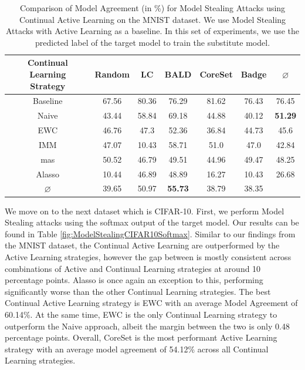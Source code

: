 \begin{table}[h]
    \centering
    \begin{tabular}{c | c c c c c | c} 
        \hline
        \diagbox[width=11em]{Active \\ Learning Strategy}{Continual Learning \\ Strategy} & Random & LC & BALD & CoreSet & Badge & $\varnothing$ \\ 
        \hline 
        Baseline & 67.56 & 80.36 & 76.29 & 81.62 & 76.43 & 76.45\\
        \hline
        Naive & 43.44 & 58.84 & 69.18 & 44.88 & 40.12 & \textbf{51.29}\\
        EWC &  46.76 & 47.3 & 52.36 & 36.84 & 44.73 & 45.6\\
        IMM & 47.07 & 10.43 & 58.71 & 51.0 & 47.0 & 42.84\\
        \gls{mas} & 50.52 & 46.79 & 49.51 & 44.96 & 49.47 & 48.25\\
        Alasso &  10.44 & 46.89 & 48.89 & 16.27 & 10.43 & 26.68\\
        \hline
        $\varnothing$ & 39.65 & 50.97 & \textbf{55.73} & 38.79 & 38.35\\
        \hline
    \end{tabular}
    \caption{Comparison of Model Agreement (in \%) for Model Stealing Attacks using Continual Active Learning on the MNIST dataset. We use Model Stealing Attacks with Active Learning as a baseline. In this set of experiments,
    we use the predicted label of the target model to train the substitute model.}
    \label{fig:ModelStealingMNISTLabel}
\end{table}

We move on to the next dataset which is CIFAR-10. First, we perform Model Stealing attacks using the softmax output of the target model. Our results can be found in Table \ref{fig:ModelStealingCIFAR10Softmax}. Similar to our findings from the MNIST dataset, the Continual Active Learning
are outperformed by the Active Learning strategies, however the gap between is mostly consistent across combinations of Active and Continual Learning strategies at around 10 percentage points. Alasso is once again an exception to this, performing significantly worse than the other
Continual Learning strategies. The best Continual Active Learning strategy is EWC with an average Model Agreement of 60.14\%. At the same time, EWC is the only Continual Learning strategy to outperform the Naive approach, albeit the margin between the two is only 0.48 percentage points.
Overall, CoreSet is the most performant Active Learning strategy with an average model agreement of 54.12\% across all Continual Learning strategies. \par

